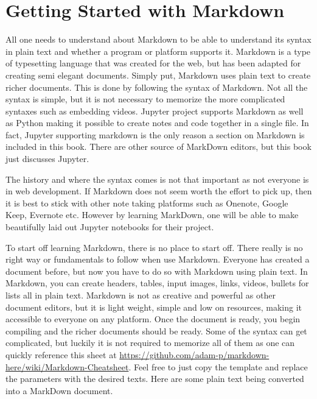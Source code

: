 \documentclass[11pt,a4paper]{book}
\begin{document}
	\section{Getting Started with Markdown}
		All one needs to understand about Markdown to be able to understand its syntax in plain text and whether a program or platform supports it. Markdown is a type of typesetting language that was created for the web, but has been adapted for creating semi elegant documents. Simply put, Markdown uses plain text to create richer documents. This is done by following the syntax of Markdown. Not all the syntax is simple, but it is not necessary to memorize the more complicated syntaxes such as embedding videos. Jupyter project supports Markdown as well as Python making it possible to create notes and code together in a single file. In fact, Jupyter supporting markdown is the only reason a section on Markdown is included in this book. There are other source of MarkDown editors, but this book just discusses Jupyter. 
		
		The history and where the syntax comes is not that important as not everyone is in web development. If Markdown does not seem worth the effort to pick up, then it is best to stick with other note taking platforms such as Onenote, Google Keep, Evernote etc. However by learning MarkDown, one will be able to make beautifully laid out Jupyter notebooks for their project.
		
		To start off learning Markdown, there is no place to start off. There really is no right way or fundamentals to follow when use Markdown. Everyone has created a document before, but now you have to do so with Markdown using plain text. In Markdown, you can create headers, tables, input images, links, videos, bullets for lists all in plain text. Markdown is not as creative and powerful as other document editors, but it is light weight, simple and low on resources, making it accessible to everyone on any platform. Once the document is ready, you begin compiling and the richer documents should be ready. Some of the syntax can get complicated, but luckily it is not required to memorize all of them as one can quickly reference this sheet at \url{https://github.com/adam-p/markdown-here/wiki/Markdown-Cheatsheet}. Feel free to just copy the template and replace the parameters with the desired texts. Here are some plain text being converted into a MarkDown document.
	
\end{document}
